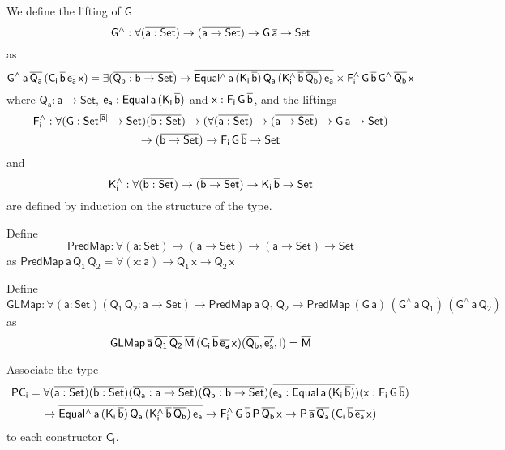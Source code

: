 \documentclass[acmsmall,screen,review,anonymous]{acmart}
\theoremstyle{definition}
\begin{document}
We define the lifting of $\mathsf{G}$
\[
\mathsf{G^{\wedge} : \forall (\overline{a : Set}) \to (\overline{a \to Set}) \to G\,\overline{a} \to Set}
\]
as
\[
\mathsf{G^{\wedge}\,\overline{a}\,\overline{Q_a}\,(C_i\,\overline{b}\,\overline{e_a}\,x)
= \exists (\overline{Q_b : b \to Set})
\to \overline{Equal^{\wedge}\,a\,(K_i\,\overline{b})\,Q_a\,(K_i^{\wedge}\,\overline{b}\,\overline{Q_b})\,e_a}
\times F_i^{\wedge}\,G\,\overline{b}\,G^{\wedge}\,{\overline{Q_b}}\,x}
\]
where $\mathsf{Q_a : a \to Set}$, $\mathsf{e_a : Equal\,a\,(K_i\,\overline{b})}$ and $\mathsf{x : F_i\,G\,\overline{b}}$,
and the liftings
\begin{multline*}
\mathsf{F_i^{\wedge} : \forall (G : Set^{\lvert\overline{a}\rvert} \to Set) (\overline{b : Set})
\to (\forall (\overline{a : Set}) \to (\overline{a \to Set}) \to G\,\overline{a} \to Set)} \\
\mathsf{\to (\overline{b \to Set})
\to F_i\,G\,\overline{b} \to Set}
\end{multline*}
and
\[
\mathsf{K_i^{\wedge} : \forall (\overline{b : Set}) \to (\overline{b \to Set}) \to K_i\,\overline{b} \to Set}
\]
are defined by induction on the structure of the type.


Define
\[
\mathsf{PredMap : \forall (a : Set) \to (a \to Set) \to (a \to Set) \to Set}
\]
as $\mathsf{PredMap\,a\,Q_1\,Q_2 = \forall (x : a) \to Q_1\,x \to Q_2\,x}$

Define
\[
\mathsf{GLMap : \forall (a : Set) (Q_1\,Q_2 : a \to Set) \to PredMap\,a\,Q_1\,Q_2 \to PredMap\,(G\,a)\,(G^{\wedge}\,a\,Q_1)\,(G^{\wedge}\,a\,Q_2)}
\]
as
\[
\mathsf{
GLMap\,\overline{a}\,\overline{Q_1}\,\overline{Q_2}\,\overline{M}\,(C_i\,\overline{b}\,\overline{e_a}\,x)(\overline{Q_b}, \overline{e'_a}, l)
= \overline{M}
}
\]

Associate the type
\begin{multline}
\mathsf{PC_i = \forall (\overline{a : Set}) (\overline{b : Set}) (\overline{Q_a : a \to Set}) (\overline{Q_b : b \to Set}) (\overline{e_a : Equal\,a\,(K_i\,\overline{b})}) (x : F_i\,G\,\overline{b})} \\
\mathsf{\to \overline{Equal^{\wedge}\,a\,(K_i\,\overline{b})\,Q_a\,(K_i^{\wedge}\,\overline{b}\,\overline{Q_b})\,e_a}
	\to F_i^{\wedge}\,G\,\overline{b}\,P\,\overline{Q_b}\,x
	\to P\,\overline{a}\,\overline{Q_a}\,(C_i\,\overline{b}\,\overline{e_a}\,x)}
\end{multline}
to each constructor $\mathsf{C_i}$.
\end{document}
